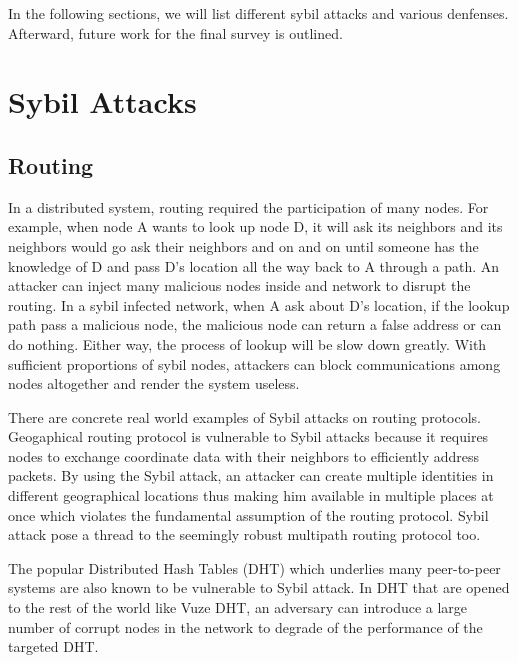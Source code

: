 \documentclass[conference]{IEEEtran}
\begin{document}
In the following sections, we will list different sybil attacks and various denfenses. Afterward, future work for the final survey is outlined.

\section{Sybil Attacks}

\subsection{Routing}
In a distributed system, routing required the participation of many nodes. For example, when node A wants to look up node D, it will ask its neighbors and its neighbors would go ask their neighbors and on and on until someone has the knowledge of D and pass D’s location all the way back to A through a path. An attacker can inject many malicious nodes inside and network to disrupt the routing. In a sybil infected network, when A ask about D’s location, if the lookup path pass a malicious node, the malicious node can return a false address or can do nothing. Either way, the process of lookup will be slow down greatly. With sufficient proportions of sybil nodes, attackers can block communications among nodes altogether and render the system useless.

There are concrete real world examples of Sybil attacks on routing protocols.
Geogaphical routing protocol is vulnerable to Sybil attacks because it requires nodes to exchange coordinate data with their neighbors to efficiently address packets. By using the Sybil attack, an attacker can create multiple identities in different geographical locations thus making him available in multiple places at once which violates the fundamental assumption of the routing protocol\cite{Karlof03securerouting}. Sybil attack pose a thread to the seemingly robust multipath routing protocol too.\cite{Karlof03securerouting}

The popular Distributed Hash Tables (DHT) which underlies many peer-to-peer systems are also known to be vulnerable to Sybil attack. In DHT that are opened to the rest of the world like Vuze DHT, an adversary can introduce a large number of corrupt nodes in the network to degrade of the performance of the targeted DHT.\cite{Danezis05sybil-resistantdht} 
\end{document}
